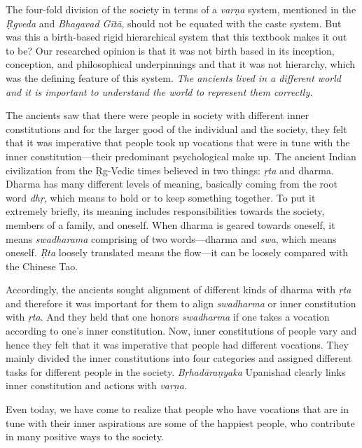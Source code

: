 The four-fold division of the society in terms of a \textit{varṇa} system, mentioned in the \textit{Ṛgveda} and \textit{Bhagavad Gītā}, should not be equated with the caste system. But was this a birth-based rigid hierarchical system that this textbook makes it out to be? Our researched opinion is that it was not birth based in its inception, conception, and philosophical underpinnings and that it was not hierarchy, which was the defining feature of this system. \textit{The ancients lived in a different world and it is important to understand the world to represent them correctly.} 

The ancients saw that there were people in society with different inner constitutions and for the larger good of the individual and the society, they felt that it was imperative that people took up vocations that were in tune with the inner constitution—their predominant psychological make up. The ancient Indian civilization from the Ṛg-Vedic times believed in two things: \textit{ŗta} and dharma. Dharma has many different levels of meaning, basically coming from the root word \textit{dhŗ},  which means to hold or to keep something together. To put it extremely briefly, its meaning includes responsibilities towards the society, members of a family, and oneself. When dharma is geared towards oneself, it means \textit{swadharama} comprising of two words—dharma and \textit{swa},  which means oneself. \textit{Ŗta} loosely translated means the flow—it can be loosely compared with the Chinese Tao. 

Accordingly, the ancients sought alignment of different kinds of dharma with \textit{ŗta} and therefore it was important for them to align \textit{swadharma} or inner constitution with \textit{ŗta}. And they held that one honors \textit{swadharma} if one takes a vocation according to one’s inner constitution. Now, inner constitutions of people vary and hence they felt that it was imperative that people had different vocations. They mainly divided the inner constitutions into four categories and assigned different tasks for different people in the society. \textit{Bṛhadāraṇyaka} Upanishad clearly links inner constitution and actions with \textit{varṇa}. 

Even today, we have come to realize that people who have vocations that are in tune with their inner aspirations are some of the happiest people, who contribute in many positive ways to the society. 

